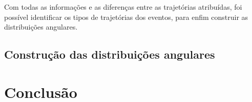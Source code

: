 \documentclass[a4paper,12pt,oneside]{book}
\begin{document}
\par Com todas as informações e as diferenças entre as trajetórias atribuídas, foi possível identificar os tipos de trajetórias dos eventos, para enfim construir as distribuições angulares.

\section{Construção das distribuições angulares}\label{sec:sec_choque}




\chapter{Conclusão}\label{chapter:conclusao}







\end{document}
